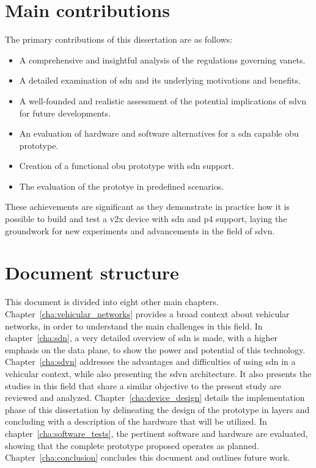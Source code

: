 
\section{Main contributions} %
\label{sec:main_contributions}

The primary contributions of this dissertation are as follows:
\begin{itemize}
    \item A comprehensive and insightful analysis of the regulations governing \glspl{vanet}.
    \item A detailed examination of \gls{sdn} and its underlying motivations and benefits.
    \item A well-founded and realistic assessment of the potential implications of \gls{sdvn} for future developments.
    \item An evaluation of hardware and software alternatives for a \gls{sdn} capable \gls{obu} prototype.
    \item Creation of a functional \gls{obu} prototype with \gls{sdn} support.
    \item The evaluation of the prototye in predefined scenarios.

\end{itemize}
These achievements are significant as they demonstrate in practice how it is possible to build and test a \gls{v2x} device with \gls{sdn} and \gls{p4} support, laying the groundwork for new experiments and advancements in the field of \gls{sdvn}.


\section{Document structure} %
\label{sec:document_structure}

This document is divided into eight other main chapters. Chapter~\ref{cha:vehicular_networks} provides a broad context about vehicular networks, in order to understand the main challenges in this field. In chapter~\ref{cha:sdn}, a very detailed overview of \gls{sdn} is made, with a higher emphasis on the data plane, to show the power and potential of this technology. Chapter~\ref{cha:sdvn} addresses the advantages and difficulties of using \gls{sdn} in a vehicular context, while also presenting the \gls{sdvn} architecture. It also presents the studies in this field that share a similar objective to the present study are reviewed and analyzed. Chapter~\ref{cha:device_design} details the implementation phase of this dissertation by delineating the design of the prototype in layers and concluding with a description of the hardware that will be utilized. In chapter~\ref{cha:software_tests}, the pertinent software and hardware are evaluated, showing that the complete prototype proposed operates as planned. Chapter~\ref{cha:conclusion} concludes this document and outlines future work.




